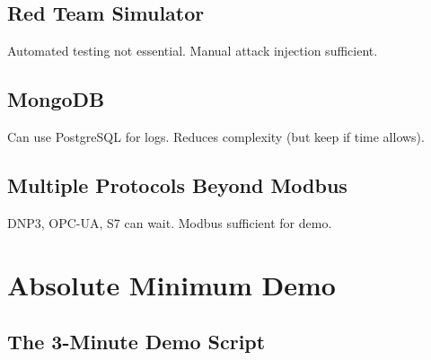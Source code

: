 \documentclass[11pt,a4paper]{article}
\begin{document}
\subsection{Red Team Simulator}
Automated testing not essential. Manual attack injection sufficient.

\subsection{MongoDB}
Can use PostgreSQL for logs. Reduces complexity (but keep if time allows).

\subsection{Multiple Protocols Beyond Modbus}
DNP3, OPC-UA, S7 can wait. Modbus sufficient for demo.

\section{Absolute Minimum Demo}

\subsection{The 3-Minute Demo Script}
\end{document}
